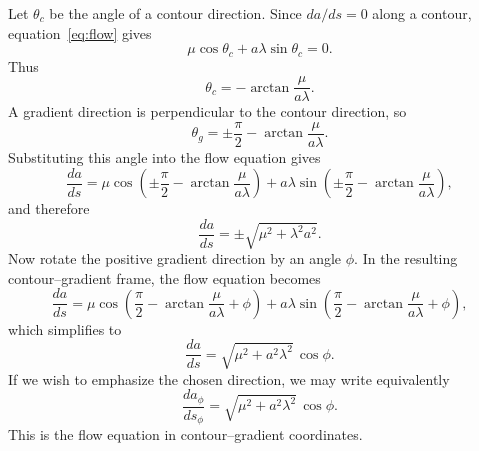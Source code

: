Let $\theta_c$ be the angle of a contour direction. Since $da/ds=0$ along a contour, equation~\eqref{eq:flow} gives
\begin{equation}
    \mu \cos \theta_c + a \lambda \sin \theta_c = 0.
    \label{eq:contour}
\end{equation}
Thus
\begin{equation}
    \theta_c = - \arctan \frac{\mu}{a \lambda}.
    \label{eq:contourangle}
\end{equation}
A gradient direction is perpendicular to the contour direction, so
\begin{equation}
    \theta_g = \pm \frac{\pi}{2} - \arctan \frac{\mu}{a \lambda}.
    \label{eq:gradientangle}
\end{equation}
Substituting this angle into the flow equation gives
\begin{equation}
    \frac{da}{ds} = \mu \cos \!\left(\pm \frac{\pi}{2} - \arctan \frac{\mu}{a \lambda}\right) + a \lambda \sin \!\left(\pm \frac{\pi}{2} - \arctan \frac{\mu}{a \lambda}\right),
    \label{eq:alonggradient}
\end{equation}
and therefore
\begin{equation}
    \frac{da}{ds} = \pm \sqrt{\mu^2 + \lambda^2 a^2}.
    \label{eq:grad}
\end{equation}
Now rotate the positive gradient direction by an angle $\phi$. In the resulting contour--gradient frame, the flow equation becomes
\begin{equation}
    \frac{da}{ds} = \mu \cos \!\left(\frac{\pi}{2} - \arctan \frac{\mu}{a \lambda} + \phi\right) + a \lambda \sin \!\left(\frac{\pi}{2} - \arctan \frac{\mu}{a \lambda} + \phi\right),
    \label{eq:fourfold}
\end{equation}
which simplifies to
\begin{equation}
    \frac{da}{ds} = \sqrt {\mu^2 + a^2 \lambda^2} \, \cos \phi.
    \label{eq:contourgradient}
\end{equation}
If we wish to emphasize the chosen direction, we may write equivalently
\begin{equation}
    \frac{da_{\phi}}{ds_{\phi}} = \sqrt {\mu^2 + a^2 \lambda^2} \, \cos \phi.
    \label{eq:contourgradient2}
\end{equation}
This is the flow equation in contour--gradient coordinates.

